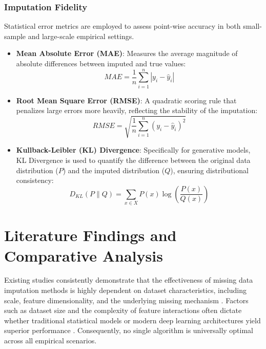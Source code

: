 \documentclass[twocolumn, 9pt]{extarticle}
\begin{document}
\subsubsection{Imputation Fidelity}
Statistical error metrics are employed to assess point-wise accuracy in both small-sample and large-scale empirical settings.\cite{sun2023deep}
\begin{itemize}
    \item \textbf{Mean Absolute Error (MAE)}: Measures the average magnitude of absolute differences between imputed and true values:
    \begin{equation}
        MAE = \frac{1}{n} \sum_{i=1}^{n} |y_i - \hat{y}_i|
    \end{equation}
    \item \textbf{Root Mean Square Error (RMSE)}: A quadratic scoring rule that penalizes large errors more heavily, reflecting the stability of the imputation:
    \begin{equation}
        RMSE = \sqrt{\frac{1}{n} \sum_{i=1}^{n} (y_i - \hat{y}_i)^2}
    \end{equation}
    \item \textbf{Kullback-Leibler (KL) Divergence}: Specifically for generative models, KL Divergence is used to quantify the difference between the original data distribution ($P$) and the imputed distribution ($Q$), ensuring distributional consistency:
    \begin{equation}
        D_{KL}(P \parallel Q) = \sum_{x \in X} P(x) \log\left(\frac{P(x)}{Q(x)}\right)
    \end{equation}
\end{itemize}

\section{Literature Findings and Comparative Analysis}

Existing studies consistently demonstrate that the effectiveness of missing data imputation methods is highly dependent on dataset characteristics, including scale, feature dimensionality, and the underlying missing mechanism \cite{sun2023deep}. Factors such as dataset size and the complexity of feature interactions often dictate whether traditional statistical models or modern deep learning architectures yield superior performance \cite{sun2023deep, Grinsztajn2022}. Consequently, no single algorithm is universally optimal across all empirical scenarios.\cite{sun2023deep}
\end{document}
